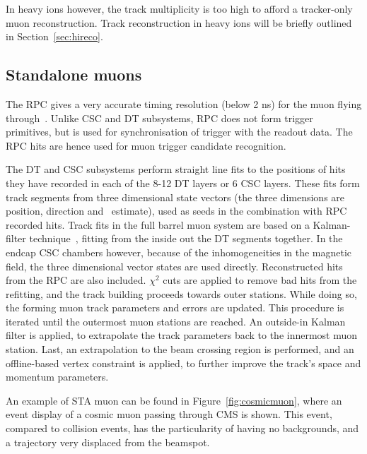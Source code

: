  In heavy ions however, the
track multiplicity is too high to afford a tracker-only muon
reconstruction. Track reconstruction in heavy ions will be briefly
outlined in Section~\ref{sec:hireco}.


\subsection{Standalone muons}
\label{sec:STA}
The RPC gives a very accurate timing resolution (below 2 ns)
for the muon flying through~\cite{Chatrchyan:2013sba}. Unlike CSC and DT subsystems, RPC does not
form trigger primitives, but is used for synchronisation of trigger with
the readout data. The RPC hits are hence used for muon trigger
candidate recognition.%


The DT and CSC subsystems perform straight line fits to the positions
of hits they have recorded in each of the 8-12 DT layers or 6 CSC layers.
These fits form track segments from three dimensional state vectors
(the three dimensions are position, direction and \pt\ estimate), used as seeds in the combination with
RPC recorded hits. Track fits in the full barrel muon system are based on a
Kalman-filter technique~\cite{Fruhwirth1987444}, fitting from the
inside out the DT segments together. In the endcap CSC chambers however, because
of the inhomogeneities in the magnetic field, the three dimensional
vector states are used directly. Reconstructed hits from the RPC are
also included. $\chi^{2}$ cuts are applied to remove bad hits from the
refitting, and the track building proceeds towards outer
stations. While doing so, the forming muon track parameters and errors
are updated. This procedure is iterated until the outermost muon
stations are reached. An outside-in Kalman filter is applied, to
extrapolate the track parameters back to the innermost muon
station. Last, an extrapolation to the beam crossing region is
performed, and an offline-based vertex constraint is applied, to
further improve the track's space and momentum parameters.

An example of STA muon can be found in Figure~\ref{fig:cosmicmuon},
where an event display of a cosmic muon passing through CMS is
shown. This event, compared to collision events, has the particularity
of having no backgrounds, and a trajectory very displaced from the
beamspot.

